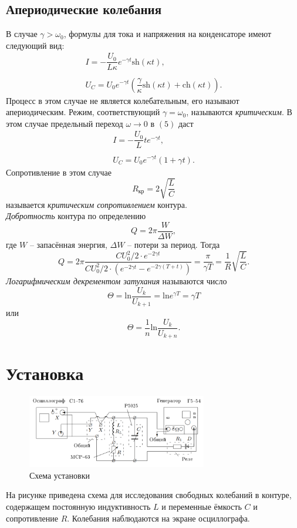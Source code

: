 \documentclass[a4paper, 12pt]{article}%
\begin{document}
\subsection*{Апериодические колебания}
В случае $\gamma > \omega_0$, формулы для тока и напряжения на конденсаторе имеют следующий вид:
$$
\begin{array}{c}
I = -\dfrac{U_0}{L\kappa}e^{-\gamma t}\text{sh}(\kappa t),\\
\\
U_C = U_0 e^{-\gamma t}\left( \dfrac{\gamma}{\kappa}\text{sh}(\kappa t) + \text{ch}(\kappa t) \right).
\end{array}
$$
Процесс в этом случае не является колебательным, его называют апериодическим. Режим, соответствующий $\gamma = \omega_0$, называются \textit{критическим}. В этом случае предельный переход $\omega \rightarrow 0$ в $(5)$ даст 
$$
\begin{array}{c}
I = -\dfrac{U_0}{L}te^{-\gamma t},\\
\\
U_C=U_0 e^{-\gamma t}(1+\gamma t).
\end{array}
$$
Сопротивление в этом случае 
\begin{equation}
R_{\text{кр}}= 2 \sqrt{\dfrac{L}{C}}
\end{equation}
называется \textit{критическим сопротивлением} контура.\\
\textit{Добротность} контура по определению 
$$
Q = 2\pi \dfrac{W}{\Delta W},
$$ 
где $W$ -- запасённая энергия, $\Delta W$ -- потери за период. Тогда
$$
Q = 2\pi\dfrac{CU_0^2/2 \cdot e^{-2\gamma t}}{CU_0^2/2 \cdot (e^{-2\gamma t} - e^{-2\gamma (T+t)})}=\dfrac{\pi}{\gamma T}=\dfrac{1}{R}\sqrt{\dfrac{L}{C}}.
$$
\textit{Логарифмическим декрементом затухания} называются число
$$
\Theta = \text{ln}\dfrac{U_k}{U_{k+1}}=\text{ln} e^{\gamma T}=\gamma T
$$
или 
$$
\Theta = \dfrac{1}{n} \text{ln}\dfrac{U_k}{U_{k+n}}.
$$
\newpage
\section*{Установка}
\begin{figure}[h!]
\begin{center}
\includegraphics[width = 0.7\textwidth]{1.png}
\caption{Схема установки}
\end{center}
\end{figure}
На рисунке приведена схема для исследования свободных колебаний в контуре, содержащем постоянную индуктивность $L$ и переменные ёмкость $C$ и сопротивление $R$. Колебания наблюдаются на экране осциллографа.
\end{document}
